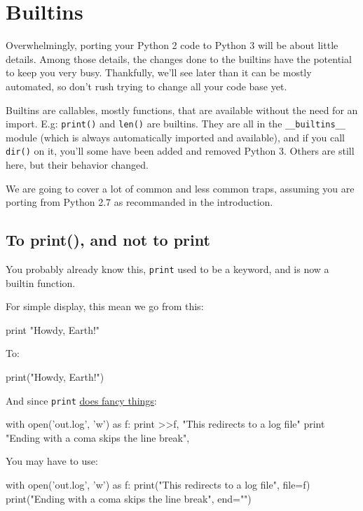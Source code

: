 
\chapter{Builtins}

Overwhelmingly, porting your Python 2 code to Python 3 will be about little details. Among those details, the changes done to the builtins have the potential to keep you very busy. Thankfully, we'll see later than it can be mostly automated, so don't rush trying to change all your code base yet.

Builtins are \glspl{callable}, mostly functions, that are available without the need for an import. E.g: \lstinline{print()} and \lstinline{len()} are builtins. They are all in the \lstinline{__builtins__} module (which is always automatically imported and available), and if you call \lstinline{dir()} on it, you'll some have been added and removed Python 3. Others are still here, but their behavior changed.

We are going to cover a lot of common and less common traps, assuming you are porting from Python 2.7 as recommanded in the introduction.

\section{To print(), and not to print}

You probably already know this, \lstinline{print} used to be a keyword, and is now a builtin function.

For simple display, this mean we go from this:

\begin{py2}
print "Howdy, Earth!"
\end{py2}


To:

\begin{py3}
print("Howdy, Earth!")
\end{py3}

And since \lstinline{print} \href{https://www.python.org/dev/peps/pep-0214/}{does fancy things}:

\begin{py2}
with open('out.log', 'w') as f:
    print >>f, "This redirects to a log file"
print "Ending with a coma skips the line break",
\end{py2}

You may have to use:

\begin{py3}
with open('out.log', 'w') as f:
    print("This redirects to a log file", file=f)
print("Ending with a coma skips the line break", end="")
\end{py3}

